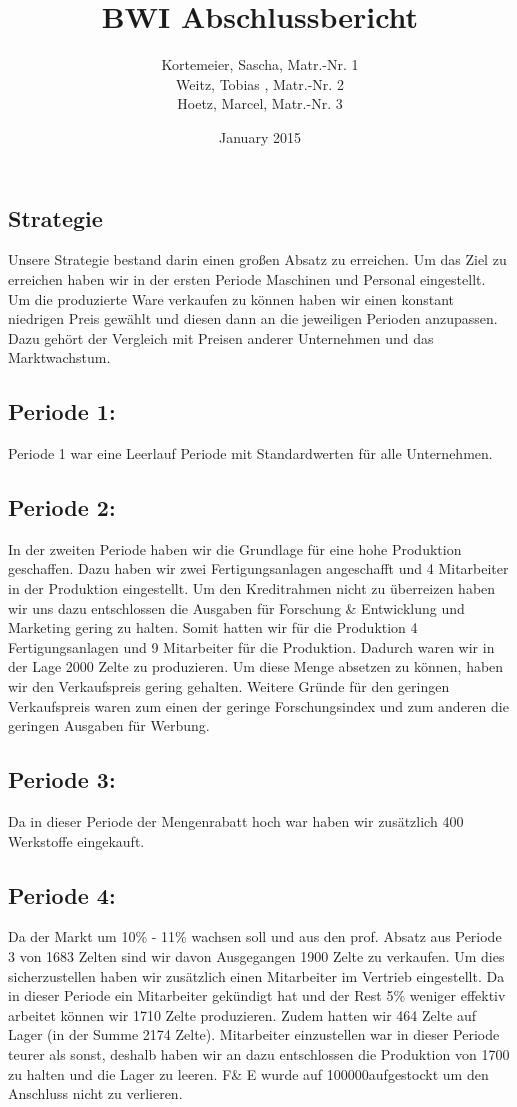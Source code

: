 \documentclass[a4paper, 12pt]{article}
\title{BWI Abschlussbericht}
\author{Kortemeier, Sascha, Matr.-Nr. 1 \\
Weitz, Tobias , Matr.-Nr. 2 \\
Hoetz, Marcel, Matr.-Nr. 3}
\date{January 2015}
\begin{document}
\maketitle
\begin{flushleft}
\section{Strategie}
Unsere Strategie bestand darin einen großen Absatz zu erreichen. 
Um das Ziel zu erreichen haben wir in der ersten Periode Maschinen und Personal eingestellt. 
Um die produzierte Ware verkaufen zu können haben wir einen konstant niedrigen Preis gewählt und diesen dann an die jeweiligen Perioden anzupassen. 
Dazu gehört der Vergleich mit Preisen anderer Unternehmen und das Marktwachstum. 

\subsection{Periode 1:}
Periode 1 war eine Leerlauf Periode mit Standardwerten für alle Unternehmen.	

\subsection{Periode 2:}
In der zweiten Periode haben wir die Grundlage für eine hohe Produktion geschaffen.
Dazu haben wir zwei Fertigungsanlagen angeschafft und 4 Mitarbeiter in der Produktion eingestellt.
Um den Kreditrahmen nicht zu überreizen haben wir uns dazu entschlossen die Ausgaben für Forschung \& Entwicklung und Marketing gering zu halten.
Somit hatten wir für die Produktion 4 Fertigungsanlagen und 9 Mitarbeiter für die Produktion.
Dadurch waren wir in der Lage 2000 Zelte zu produzieren.
Um diese Menge absetzen zu können, haben wir den Verkaufspreis gering gehalten.
Weitere Gründe für den geringen Verkaufspreis waren zum einen der geringe Forschungsindex und zum anderen die geringen Ausgaben für Werbung.

\subsection{Periode 3:}
Da in dieser Periode der Mengenrabatt hoch war haben wir zusätzlich 400 Werkstoffe eingekauft. 

\subsection{Periode 4:}
Da der Markt um 10\% - 11\% wachsen soll und aus den prof. Absatz aus Periode 3 von 1683 Zelten sind wir davon Ausgegangen 1900 Zelte zu verkaufen.
Um dies sicherzustellen haben wir zusätzlich einen Mitarbeiter im Vertrieb eingestellt.
Da in dieser Periode ein Mitarbeiter gekündigt hat und der Rest 5\% weniger effektiv arbeitet können wir  1710 Zelte produzieren.
Zudem hatten wir 464 Zelte auf Lager (in der Summe 2174 Zelte).
Mitarbeiter einzustellen war in dieser Periode teurer als sonst,
deshalb haben wir an dazu entschlossen die Produktion von 1700 zu halten und die Lager zu leeren.
F\& E wurde auf 100000\texteuro aufgestockt um den Anschluss nicht zu verlieren.  


\end{flushleft}
\end{document}
